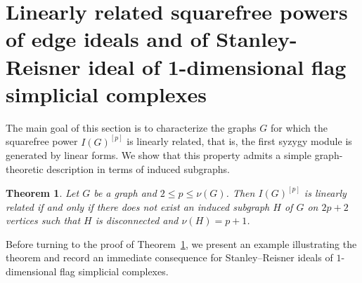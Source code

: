 \documentclass[12pt]{amsart}
\newtheorem{Theorem}{Theorem}[section]
\begin{document}

\section{Linearly related squarefree powers of edge ideals and of Stanley-Reisner ideal of 1-dimensional flag simplicial complexes}\label{Sec: linearly related}

The main goal of this section is to characterize the graphs $G$ for which the squarefree power $I(G)^{[p]}$ is linearly related, that is, the first syzygy module is generated by linear forms. We show that this property admits a simple graph-theoretic description in terms of induced subgraphs.



\begin{Theorem}\label{Thm:linrelated1}
Let $G$ be a graph and $2 \leq p \leq \nu(G)$. Then $I(G)^{[p]}$ is linearly related if and only if there does not exist an induced subgraph $H$ of $G$ on $2p+2$ vertices such that $H$ is disconnected and $\nu(H) = p+1$.
\end{Theorem}

Before turning to the proof of Theorem~\ref{Thm:linrelated1}, we present an example illustrating the theorem and record an immediate consequence for Stanley--Reisner ideals of $1$-dimensional flag simplicial complexes.
\end{document}
